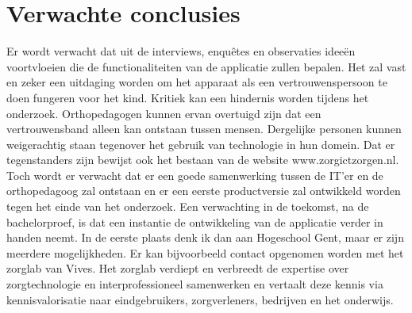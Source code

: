 \section{Verwachte conclusies}
\label{sec:verwachte_conclusies}

Er wordt verwacht dat uit de interviews, enquêtes en observaties ideeën voortvloeien die de functionaliteiten van de applicatie zullen bepalen. Het zal vast en zeker een uitdaging worden om het apparaat als een vertrouwenspersoon te doen fungeren voor het kind.
Kritiek kan een hindernis worden tijdens het onderzoek.
Orthopedagogen kunnen ervan overtuigd zijn dat een vertrouwensband alleen kan ontstaan tussen mensen. Dergelijke personen kunnen weigerachtig staan tegenover het gebruik van technologie in hun domein.
Dat er tegenstanders zijn bewijst ook het bestaan van de website www.zorgictzorgen.nl.
Toch wordt er verwacht dat er een goede samenwerking tussen de IT'er en de orthopedagoog zal ontstaan en er een eerste productversie zal ontwikkeld worden tegen het einde van het onderzoek.
Een verwachting in de toekomst, na de bachelorproef, is dat een instantie de ontwikkeling van de applicatie verder in handen neemt. In de eerste plaats denk ik dan aan Hogeschool Gent, maar er zijn meerdere mogelijkheden. Er kan bijvoorbeeld contact opgenomen worden met het zorglab van Vives. Het zorglab verdiept en verbreedt de expertise over zorgtechnologie en interprofessioneel samenwerken en vertaalt deze kennis via kennisvalorisatie naar eindgebruikers, zorgverleners, bedrijven en het onderwijs.~\autocite{Vives}

